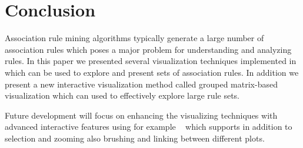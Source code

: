 \documentclass[nojss]{jss}
\begin{document}
%
%



\section{Conclusion}
\label{sec:conclusion}

Association rule mining algorithms typically generate a large number of
association rules which poses a major problem for understanding and analyzing
rules.  In this paper we presented several visualization techniques
implemented in  which can be used to explore and present
sets of association rules.
In addition we present a new interactive visualization method called
grouped matrix-based visualization which can used to effectively
explore large rule sets.

Future development will focus on
enhancing the visualizing techniques with advanced interactive features
using for example ~\citep{arulesViz:Urbanek:2003}
which supports in addition to selection and zooming
also brushing and linking between different plots.

%

\end{document}
